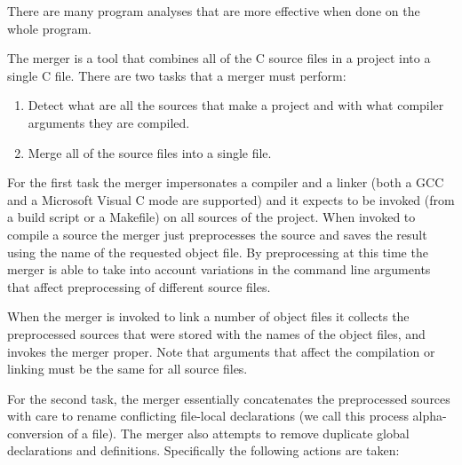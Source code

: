 \documentclass[letterpaper]{article}
\begin{document}
 There are many program analyses that are more effective when
done on the whole program.

 The merger is a tool that combines all of the C source files in a project
into a single C file. There are two tasks that a merger must perform:
\begin{enumerate}
\item Detect what are all the sources that make a project and with what
compiler arguments they are compiled.

\item Merge all of the source files into a single file. 
\end{enumerate}

 For the first task the merger impersonates a compiler and a linker (both a
GCC and a Microsoft Visual C mode are supported) and it expects to be invoked
(from a build script or a Makefile) on all sources of the project. When
invoked to compile a source the merger just preprocesses the source and saves
the result using the name of the requested object file. By preprocessing at
this time the merger is able to take into account variations in the command
line arguments that affect preprocessing of different source files.

 When the merger is invoked to link a number of object files it collects the
preprocessed sources that were stored with the names of the object files, and
invokes the merger proper. Note that arguments that affect the compilation or
linking must be the same for all source files.

 For the second task, the merger essentially concatenates the preprocessed
sources with care to rename conflicting file-local declarations (we call this
process alpha-conversion of a file). The merger also attempts to remove
duplicate global declarations and definitions. Specifically the following
actions are taken: 
\end{document}
